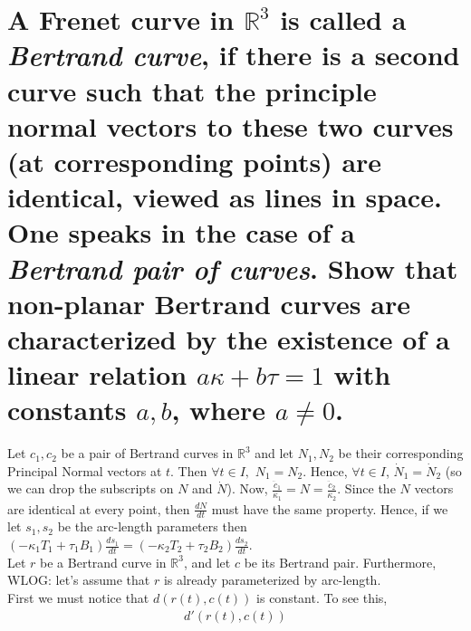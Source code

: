 \documentclass[12pt]{amsart}
\begin{document}
\section{A Frenet curve in $\mathbb{R}^3$ is called a \emph{Bertrand curve}, if there is a second curve such that the principle normal vectors to these two curves (at corresponding points) are identical, viewed as lines in space. One speaks in the case of a \emph{Bertrand pair of curves}. Show that non-planar Bertrand curves are characterized by the existence of a linear relation $a\kappa+b\tau=1$ with constants $a,b$, where $a\neq0$.} Let $c_1,c_2$ be a pair of Bertrand curves in $\mathbb{R}^3$ and let $N_1,N_2$ be their corresponding Principal Normal vectors at $t$. Then $\forall t\in I,$ $N_1=N_2$. Hence, $\forall t\in I$, $\dot N_1=\dot N_2$ (so we can drop the subscripts on $N$ and $\dot N$). Now, $\frac{\ddot c_1}{\kappa_1}=N=\frac{\ddot c_2}{\kappa_2}$. Since the $N$ vectors are identical at every point, then $\frac{dN}{dt}$ must have the same property. Hence, if we let $s_1,s_2$ be the arc-length parameters then $(-\kappa_1T_1+\tau_1B_1)\frac{ds_1}{dt}=(-\kappa_2T_2+\tau_2B_2)\frac{ds_2}{dt}$.
\\Let $r$ be a Bertrand curve in $\mathbb{R}^3$, and let $c$ be its Bertrand pair. Furthermore, WLOG: let's assume that $r$ is already parameterized by arc-length.
\\First we must notice that $d(r(t),c(t))$ is constant. To see this,
\begin{align*}
	d'(r(t),c(t))
\end{align*}

\newpage
\end{document}
